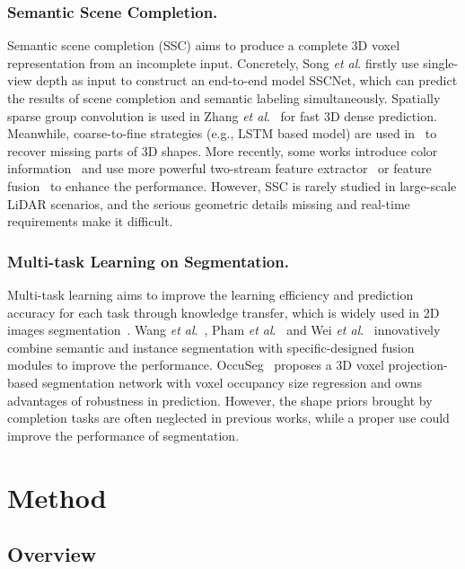 \documentclass[letterpaper]{article} \usepackage{aaai21}  \usepackage{times}  \usepackage{helvet} \usepackage{courier}  \usepackage[hyphens]{url}  \usepackage{graphicx} \urlstyle{rm} \def\UrlFont{\rm}  \usepackage{natbib}  \usepackage{booktabs}
\begin{document}
	\subsubsection{Semantic Scene Completion.}
	Semantic scene completion (SSC) aims to produce a complete 3D voxel representation from an incomplete input. Concretely, Song \textit{et al}.\cite{Song2017Semantic} firstly use single-view depth as input to construct an end-to-end model SSCNet, which can predict the results of scene completion and semantic labeling simultaneously. Spatially sparse group convolution is used in Zhang \textit{et al}.~\cite{Jiahui2019Efficient} for fast 3D dense prediction. 
Meanwhile, coarse-to-fine strategies (e.g., LSTM based model) are used in~\cite{Dai2017ScanComplete,Han2017High} to recover missing parts of 3D shapes.
More recently, some works introduce color information~\cite{Garbade_2019_CVPR_Workshops} and use more powerful two-stream feature extractor~\cite{li2019rgbd} or feature fusion~\cite{liu20203d} to enhance the performance. However, SSC is rarely studied in large-scale LiDAR scenarios, and the serious geometric details missing and real-time requirements make it difficult.
	


	\subsubsection{Multi-task Learning on Segmentation.}
	Multi-task learning aims to improve the learning efficiency and prediction accuracy for each task through knowledge transfer, which is widely used in 2D images segmentation~\cite{kendall2018multi}. Wang \textit{et al}.~\cite{wang2019associatively}, Pham \textit{et al}.~\cite{pham2019jsis3d} and Wei \textit{et al}.~\cite{wei2020multi} innovatively combine semantic and instance segmentation with specific-designed fusion modules to improve the performance. OccuSeg~\cite{han2020occuseg} proposes a 3D voxel projection-based segmentation network with voxel occupancy size regression and owns advantages of robustness in prediction. However, the shape priors brought by completion tasks are often neglected in previous works, while a proper use could improve the performance of segmentation.
	
	\section{Method}
	\subsection{Overview}
	
\end{document}
